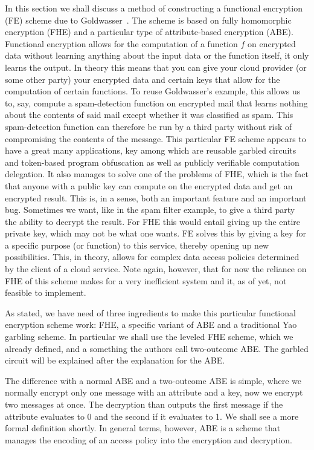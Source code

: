 \documentclass[11pt, a4paper]{article}
\begin{document}
In this section we shall discuss a method of constructing a functional encryption (FE) scheme due to Goldwasser~\cite{goldwasser2013reusable}. 
The scheme is based on fully homomorphic encryption (FHE) and a particular type of attribute-based encryption (ABE).
Functional encryption allows for the computation of a function $f$ on encrypted data without learning anything about the input data or the function itself, it only learns the output.
In theory this means that you can give your cloud provider (or some other party) your encrypted data and certain keys that allow for the computation of certain functions.
To reuse Goldwasser's example, this allows us to, say, compute a spam-detection function on encrypted mail that learns nothing about the contents of said mail except whether it was classified as spam. 
This spam-detection function can therefore be run by a third party without risk of compromising the contents of the message.
This particular FE scheme appears to have a great many applications, key among which are reusable garbled circuits and token-based program obfuscation as well as publicly verifiable computation delegation.
It also manages to solve one of the problems of FHE, which is the fact that anyone with a public key can compute on the encrypted data and get an encrypted result.
This is, in a sense, both an important feature and an important bug.
Sometimes we want, like in the spam filter example, to give a third party the ability to decrypt the result.
For FHE this would entail giving up the entire private key, which may not be what one wants.
FE solves this by giving a key for a specific purpose (or function) to this service, thereby opening up new possibilities.
This, in theory, allows for complex data access policies determined by the client of a cloud service.
Note again, however, that for now the reliance on FHE of this scheme makes for a very inefficient system and it, as of yet, not feasible to implement.

As stated, we have need of three ingredients to make this particular functional encryption scheme work: FHE, a specific variant of ABE and a traditional Yao garbling scheme.
In particular we shall use the leveled FHE scheme, which we already defined,  and a something the authors call two-outcome ABE.
The garbled circuit will be explained after the explanation for the ABE.

The difference with a normal ABE and a two-outcome ABE is simple, where we normally encrypt only one message with an attribute and a key, now we encrypt two messages at once.
The decryption than outputs the first message if the attribute evaluates to 0 and the second if it evaluates to 1.
We shall see a more formal definition shortly.
In general terms, however, ABE is a scheme that manages the encoding of an access policy into the encryption and decryption.
\end{document}
